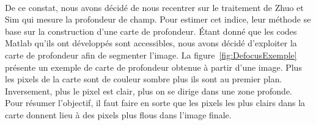\documentclass[11pt, french]{report-rd-info}
\begin{document}
\paragraph*{}
De ce constat, nous avons décidé de nous recentrer sur le traitement de Zhuo et Sim \cite{Zhuo2011} qui mesure la profondeur de champ. Pour estimer cet indice, leur méthode se base sur la construction d'une carte de profondeur. Étant donné que les codes Matlab qu'ils ont développés sont accessibles, nous avons décidé d'exploiter la carte de profondeur afin de segmenter l'image. La figure~\ref{fig:DefocusExemple} présente un exemple de carte de profondeur obtenue à partir d'une image. Plus les pixels de la carte sont de couleur sombre plus ils sont au premier plan. Inversement, plus le pixel est clair, plus on se dirige dans une zone profonde. Pour résumer l'objectif, il faut faire en sorte que les pixels les plus clairs dans la carte donnent lieu à des pixels plus flous dans l'image finale.
\end{document}
